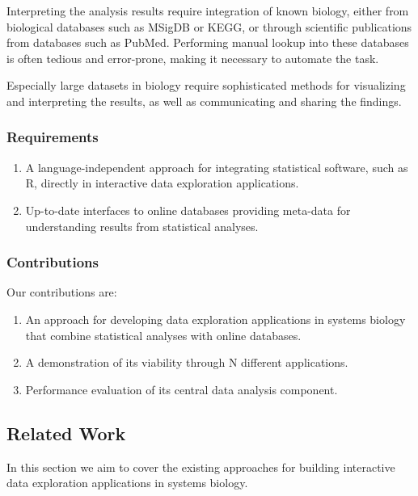 Interpreting the analysis results require integration of known biology, either
from biological databases such as MSigDB\cite{} or KEGG\cite{}, or through
scientific publications from databases such as PubMed\cite{}. Performing manual
lookup into these databases is often tedious and error-prone, making it
necessary to automate the task. %

Especially large datasets in biology require sophisticated methods for
visualizing and interpreting the results, as well as communicating and sharing
the findings.


\subsubsection*{Requirements} 
\begin{enumerate}
    \item A language-independent approach for integrating statistical software,
    such as R, directly in interactive data exploration applications.
    \item Up-to-date interfaces to online databases providing meta-data for
    understanding results from statistical analyses. 
\end{enumerate} 

\subsubsection*{Contributions} 
Our contributions are: 
\begin{enumerate}
\item An approach for developing data exploration applications in systems
biology that combine statistical analyses with online databases.  
\item A demonstration of its viability through N different applications. 
\item Performance evaluation of its central data analysis component. 
\end{enumerate} 


\subsection*{Related Work} 
In this section we aim to cover the existing approaches for building interactive
data exploration applications in systems biology. 


